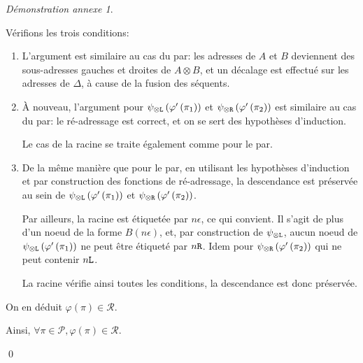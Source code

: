 \documentclass[11pt,a4paper]{article}
\theoremstyle{plain}
\theoremstyle{definition}
\theoremstyle{remark}
\newtheorem{demonstrationappendix}{Démonstration annexe}
\newcommand*{\tensor}{\otimes}
\newcommand*{\someproof}{\pi}
\newcommand*{\sequentbis}{\Delta}
\newcommand*{\Left}{\textnormal{\texttt{L}}}
\newcommand*{\Right}{\textnormal{\texttt{R}}}
\newcommand*{\proofs}{\ensuremath{\mathcal{P}}}
\newcommand*{\representations}{\ensuremath{\mathcal{R}}}
\newcommand*{\encode}{\ensuremath{\varphi}}
\begin{document}
\begin{demonstrationappendix}
\begin{description}
    Vérifions les trois conditions:
    \begin{enumerate}
        \item L'argument est similaire au cas du par: les adresses de $A$ et $B$ deviennent des sous-adresses gauches et droites de $A \tensor B$, et un décalage est effectué sur les adresses de $\sequentbis$, à cause de la fusion des séquents.

        \item À nouveau, l'argument pour $\psi_{\tensor\Left} \left( \encode' \left( \pi_1 \right) \right)$ et $\psi_{\tensor\Right} \left( \encode' \left( \pi_2 \right) \right)$ est similaire au cas du par: le ré-adressage est correct, et on se sert des hypothèses d'induction.
        
        Le cas de la racine se traite également comme pour le par.

        \item De la même manière que pour le par, en utilisant les hypothèses d'induction et par construction des fonctions de ré-adressage, la descendance est préservée au sein de $\psi_{\tensor\Left} \left( \encode' \left( \pi_1 \right) \right)$ et $\psi_{\tensor\Right} \left( \encode' \left( \pi_2 \right) \right)$.

        Par ailleurs, la racine est étiquetée par $n \epsilon$, ce qui convient. Il s'agit de plus d'un noeud de la forme $B(n \epsilon)$, et, par construction de $\psi_{\tensor\Left}$, aucun noeud de $\psi_{\tensor\Left} \left( \encode' \left( \pi_1 \right) \right)$ ne peut être étiqueté par $n \Right$. Idem pour $\psi_{\tensor\Right} \left( \encode' \left( \pi_2 \right) \right)$ qui ne peut contenir $n \Left$.

        La racine vérifie ainsi toutes les conditions, la descendance est donc préservée.
    \end{enumerate}

    On en déduit $\encode \left( \someproof \right) \in \representations$.
    \end{description}

    Ainsi, $\forall \someproof \in \proofs, \encode \left( \someproof \right) \in \representations$.

    \qed{}
\end{demonstrationappendix}
\end{document}
